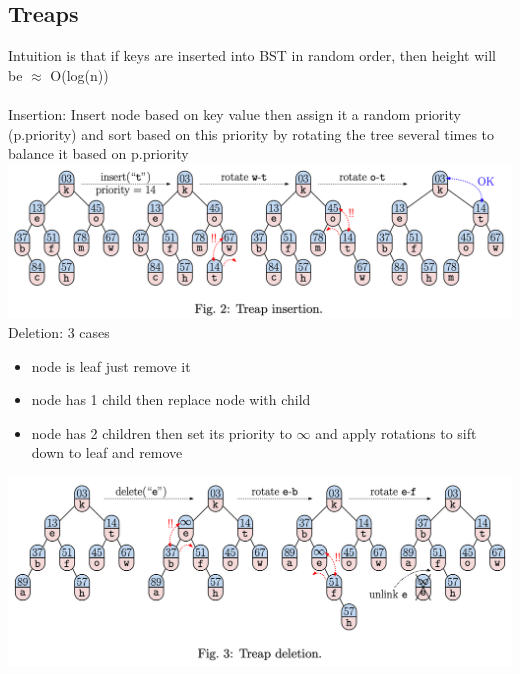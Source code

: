 \documentclass{article}
\begin{document}
  \subsection{Treaps}
  Intuition is that if keys are inserted into BST in random order, then height will be $\approx$ O(log(n))\\ \\
  Insertion: Insert node based on key value then assign it a random priority (p.priority) and sort based on this priority by rotating the tree several times to balance it based on p.priority\\
  \includegraphics[width=\textwidth]{TreapInsertion}
  Deletion: 3 cases
  \begin{itemize}[noitemsep]
  \item node is leaf just remove it
  \item node has 1 child then replace node with child
  \item node has 2 children then set its priority to $\infty$ and apply rotations to sift down to leaf and remove
  \end{itemize}
  \includegraphics[width=\textwidth]{TreapDeletion}
  \newpage
\end{document}

